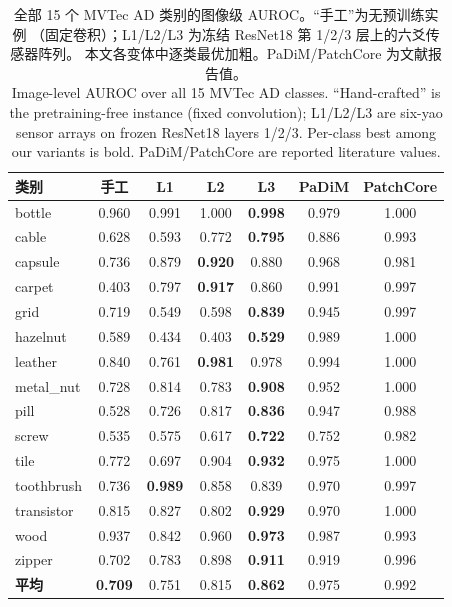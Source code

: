 \documentclass[journal,10pt]{IEEEtran}
\begin{document}
\begin{table}[t]
\centering
\caption{全部 15 个 MVTec AD 类别的图像级 AUROC。“手工”为无预训练实例
（固定卷积）；L1/L2/L3 为冻结 ResNet18 第 1/2/3 层上的六爻传感器阵列。
本文各变体中逐类最优加粗。PaDiM/PatchCore 为文献报告值。\\ Image-level
AUROC over all 15 MVTec AD classes. ``Hand-crafted'' is the pretraining-free
instance (fixed convolution); L1/L2/L3 are six-yao sensor arrays on frozen
ResNet18 layers 1/2/3. Per-class best among our variants is bold. PaDiM/PatchCore
are reported literature values.}
\label{tab:main}
\small
\begin{tabular}{lcccccc}
\toprule
类别 & 手工 & L1 & L2 & \textbf{L3} & PaDiM & PatchCore \\
\midrule
bottle     & 0.960 & 0.991 & 1.000 & \textbf{0.998} & 0.979 & 1.000 \\
cable      & 0.628 & 0.593 & 0.772 & \textbf{0.795} & 0.886 & 0.993 \\
capsule    & 0.736 & 0.879 & \textbf{0.920} & 0.880 & 0.968 & 0.981 \\
carpet     & 0.403 & 0.797 & \textbf{0.917} & 0.860 & 0.991 & 0.997 \\
grid       & 0.719 & 0.549 & 0.598 & \textbf{0.839} & 0.945 & 0.997 \\
hazelnut   & 0.589 & 0.434 & 0.403 & \textbf{0.529} & 0.989 & 1.000 \\
leather    & 0.840 & 0.761 & \textbf{0.981} & 0.978 & 0.994 & 1.000 \\
metal\_nut & 0.728 & 0.814 & 0.783 & \textbf{0.908} & 0.952 & 1.000 \\
pill       & 0.528 & 0.726 & 0.817 & \textbf{0.836} & 0.947 & 0.988 \\
screw      & 0.535 & 0.575 & 0.617 & \textbf{0.722} & 0.752 & 0.982 \\
tile       & 0.772 & 0.697 & 0.904 & \textbf{0.932} & 0.975 & 1.000 \\
toothbrush & 0.736 & \textbf{0.989} & 0.858 & 0.839 & 0.970 & 0.997 \\
transistor & 0.815 & 0.827 & 0.802 & \textbf{0.929} & 0.970 & 1.000 \\
wood       & 0.937 & 0.842 & 0.960 & \textbf{0.973} & 0.987 & 0.993 \\
zipper     & 0.702 & 0.783 & 0.898 & \textbf{0.911} & 0.919 & 0.996 \\
\midrule
\textbf{平均} & \textbf{0.709} & 0.751 & 0.815 & \textbf{0.862} & 0.975 & 0.992 \\
\bottomrule
\end{tabular}
\end{table}
\end{document}
